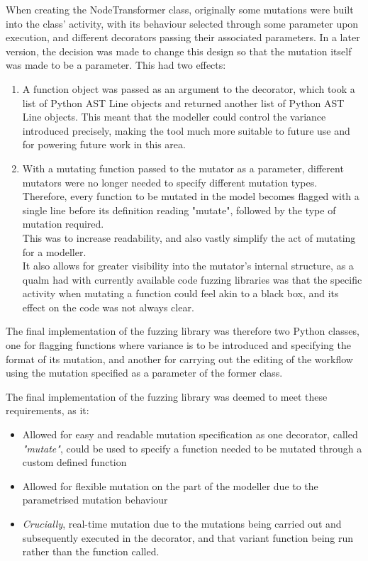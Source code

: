When creating the NodeTransformer class, originally some mutations were built into the class' activity, with its behaviour selected through some parameter upon execution, and different decorators passing their associated parameters. In a later version, the decision was made to change this design so that the mutation itself was made to be a parameter. This had two effects: 
\begin{enumerate}
    \item A function object was passed as an argument to the decorator, which took a list of Python AST Line objects and returned another list of Python AST Line objects. This meant that the modeller could control the variance introduced precisely, making the tool much more suitable to future use and for powering future work in this area.
    \item With a mutating function passed to the mutator as a parameter, different mutators were no longer needed to specify different mutation types. Therefore, every function to be mutated in the model becomes flagged with a single line before its definition reading "mutate", followed by the type of mutation required.\\This was to increase readability, and also vastly simplify the act of mutating for a modeller.\\It also allows for greater visibility into the mutator's internal structure, as a qualm had with currently available code fuzzing libraries was that the specific activity when mutating a function could feel akin to a black box, and its effect on the code was not always clear.
\end{enumerate}\par

The final implementation of the fuzzing library was therefore two Python classes, one for flagging functions where variance is to be introduced and specifying the format of its mutation, and another for carrying out the editing of the workflow using the mutation specified as a parameter of the former class.\par
The final implementation of the fuzzing library was deemed to meet these requirements, as it: 
\begin{itemize}  %
    \item Allowed for easy and readable mutation specification as one decorator, called \emph{"mutate"}, could be used to specify a function needed to be mutated through a custom defined function
    \item Allowed for flexible mutation on the part of the modeller due to the parametrised mutation behaviour
    \item \emph{Crucially}, real-time mutation due to the mutations being carried out and subsequently executed in the decorator, and that variant function being run rather than the function called.
\end{itemize} \par
